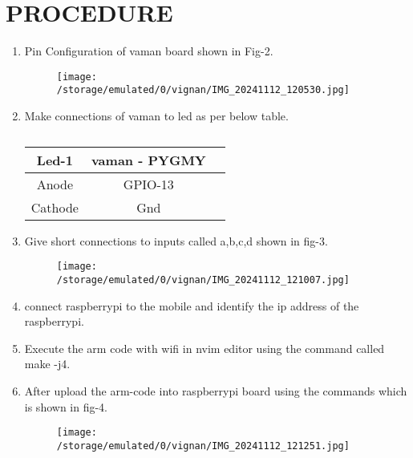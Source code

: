\documentclass[conference]{IEEEtran}
\begin{document}
\section{PROCEDURE}
 \begin{enumerate}
\item Pin Configuration of vaman board shown in Fig-2.

\begin{figure}[h]                           
\centering                                 
\texttt{[image: 	/storage/emulated/0/vignan/IMG\_20241112\_120530.jpg]}                                           
\caption{\label{fig-3:Gates}}               
\end{figure}

\item Make connections of vaman to led as per below table.

\begin{table} [htbp]
\centering
\begin{tabular}{| c | c | c |} \hline
Led-1 & vaman - PYGMY  \\\hline
Anode &  GPIO-13 \\ \hline
Cathode  & Gnd \\  
\hline
\end{tabular}
\vspace{0.1cm}
\caption{\label{tab:widgets}}
\end{table}
\item Give short connections to inputs called a,b,c,d shown in fig-3.
	\begin{figure}[h]                      
\centering                                
\texttt{[image:  
		/storage/emulated/0/vignan/IMG\_20241112\_121007.jpg]}                               
\caption{\label{fig-1:Gates}}             
\end{figure}
\item connect raspberrypi to the mobile and identify the ip address of the raspberrypi.
\item Execute the arm code with wifi in nvim editor using the command called make -j4.
\item After upload the arm-code into raspberrypi board using the commands which is shown in fig-4.
\begin{figure}[h]                       
\centering                               
\texttt{[image:  /storage/emulated/0/vignan/IMG\_20241112\_121251.jpg]}                                
\caption{\label{fig-4:Gates}}             
\end{figure}


 \end{enumerate}
\end{document}
